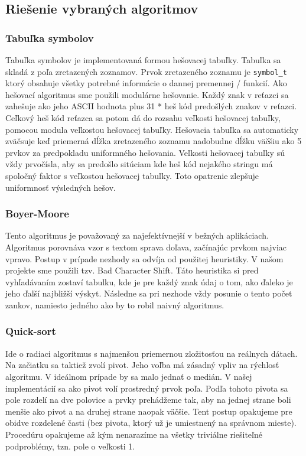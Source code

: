 \documentclass[12pt,a4paper,titlepage,final]{article}
\begin{document}
\subsection{Riešenie vybraných algoritmov}

\subsubsection{Tabuľka symbolov}
Tabuľka symbolov je implementovaná formou hešovacej tabuľky. Tabuľka sa skladá z poľa zretazených zoznamov. Prvok zretazeného zoznamu je \texttt{symbol\_t} ktorý obsahuje všetky potrebné informácie o dannej premennej / funkcií. Ako hešovací algoritmus sme použili modulárne hešovanie. Každý znak v reťazci sa zahešuje ako jeho ASCII hodnota plus 31 * heš kód predošlých znakov v reťazci. Ceľkový heš kód reťazca sa potom dá do rozsahu veľkosti hešovacej tabuľky, pomocou modula veľkostou hešovacej tabuľky. Hešovacia tabuľka sa automaticky zväčsuje keď priemerná dĺžka zretazeného zoznamu nadobudne dĺžku väčšiu ako 5 prvkov za predpokladu uniformného hešovania. Veľkosti hešovacej tabuľky sú vždy prvočísla, aby sa predošlo sitúciam kde heš kód nejakého stringu má spoločný faktor s veľkostou hešovacej tabuľky. Toto opatrenie zlepšuje uniformnosť výsledných hešov. 

\subsubsection{Boyer-Moore}

Tento algoritmus je považovaný za najefektívnejší v bežných aplikáciach. Algoritmus porovnáva vzor s textom sprava doľava, začínajúc prvkom najviac vpravo. Postup v prípade nezhody sa odvíja od použitej heuristiky. V našom projekte sme použili tzv. Bad Character Shift. Táto heuristika si pred vyhľadávaním zostaví tabulku, kde je pre každý znak údaj o tom, ako ďaleko je jeho ďalší najbližší výskyt. Následne sa pri nezhode vždy posunie o tento počet zankov, namiesto jedného ako by to robil naivný algoritmus.  

\subsubsection{Quick-sort}

Ide o radiaci algoritmus s najmenšou priemernou zložitosťou na reálnych dátach. Na začiatku sa taktiež zvolí pivot. Jeho voľba má zásadný vpliv na rýchlosť algoritmu. V ideálnom prípade by sa malo jednať o medián. V našej implementácií sa ako pivot volí prostredný prvok poľa. Podľa tohoto pivota sa pole rozdelí na dve polovice a prvky prehádžeme tak, aby na jednej strane boli menšie ako pivot a na druhej strane naopak väčšie. Tent postup opakujeme pre obidve rozdelené časti (bez pivota, ktorý už je umiestnený na správnom mieste). Procedúru opakujeme až kým nenarazíme na všetky triviálne riešiteľné podproblémy, tzn. pole o veľkosti 1. 
\end{document}
